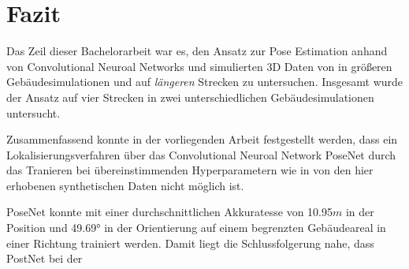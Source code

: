 
\section{Fazit}
\label{sec:kapitel_6}
Das Zeil dieser Bachelorarbeit war es, den Ansatz zur Pose Estimation anhand von Convolutional Neuroal Networks und simulierten 3D Daten von \citet{acharyaBIMPoseNetIndoorCamera2019} in größeren Gebäudesimulationen und auf \textit{längeren} Strecken zu untersuchen.
Insgesamt wurde der Ansatz auf vier Strecken in zwei unterschiedlichen Gebäudesimulationen untersucht. 

Zusammenfassend konnte in der vorliegenden Arbeit festgestellt werden, dass ein Lokalisierungsverfahren über das Convolutional Neuroal Network PoseNet durch das Tranieren bei übereinstimmenden Hyperparametern wie in \cite{acharyaBIMPoseNetIndoorCamera2019} von den hier erhobenen synthetischen Daten nicht möglich ist. 

PoseNet konnte mit einer durchschnittlichen Akkuratesse von 10.95$m$ in der Position und 49.69° in der Orientierung auf einem begrenzten Gebäudeareal in einer Richtung trainiert werden. Damit liegt die Schlussfolgerung nahe, dass PostNet bei der 

